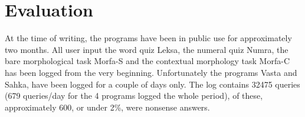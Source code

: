 \documentclass[11pt]{article}
\begin{document}




%	




\section{Evaluation}

At the time of writing, the programs have been in public use for approximately two months. %
All user input the word quiz Leksa, the numeral quiz Numra, the bare morphological task Morfa-S and the contextual morphology task Morfa-C has been logged from the very beginning. Unfortunately the programs Vasta and Sahka, have been logged for a couple of days only. The log contains 32475 queries (679 queries/day for the 4 programs logged the whole period), of these, approximately 600, or under 2\%, were nonsense answers. 
\end{document}

